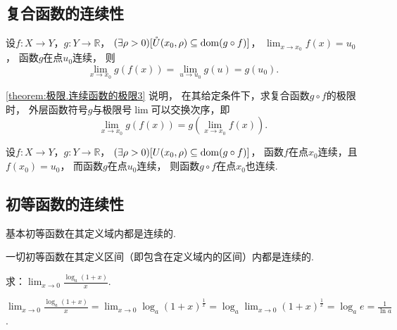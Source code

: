 \subsection{复合函数的连续性}
\begin{theorem}\label{theorem:极限.连续函数的极限3}
设\(f\colon X\to Y\)，\(g\colon Y\to\mathbb{R}\)，
\((\exists\rho>0)[\mathring{U}(x_0,\rho) \subseteq \operatorname{dom}(g \circ f)]\)，
\(\lim_{x \to x_0} f(x) = u_0\)，
函数\(g\)在点\(u_0\)连续，
则\[
	\lim_{x \to x_0} g(f(x)) = \lim_{u \to u_0} g(u) = g(u_0).
\]
\end{theorem}

\cref{theorem:极限.连续函数的极限3} 说明，
在其给定条件下，求复合函数\(g \circ f\)的极限时，
外层函数符号\(g\)与极限号\(\lim\)可以交换次序，即\[
	\lim_{x \to x_0} g(f(x))
	= g\left(\lim_{x \to x_0} f(x)\right).
\]

\begin{theorem}\label{theorem:极限.连续函数的极限4}
设\(f\colon X\to Y\)，\(g\colon Y\to\mathbb{R}\)，
\((\exists\rho>0)[U(x_0,\rho) \subseteq \operatorname{dom}(g \circ f)]\)，
函数\(f\)在点\(x_0\)连续，且\(f(x_0) = u_0\)，
而函数\(g\)在点\(u_0\)连续，
则函数\(g \circ f\)在点\(x_0\)也连续.
\end{theorem}

\subsection{初等函数的连续性}
\begin{theorem}
基本初等函数在其定义域内都是连续的.
\end{theorem}

\begin{corollary}
一切初等函数在其定义区间（即包含在定义域内的区间）内都是连续的.
\end{corollary}

\begin{example}
求：\(\lim_{x\to0} \frac{\log_a (1+x)}{x}\).
\begin{solution}
\(\lim_{x\to0} \frac{\log_a (1+x)}{x}
= \lim_{x\to0} \log_a (1+x)^{\frac{1}{x}}
= \log_a \lim_{x\to0} (1+x)^{\frac{1}{x}}
= \log_a e
= \frac{1}{\ln a}\).
\end{solution}
\end{example}


